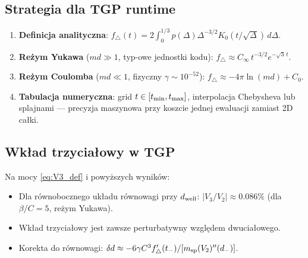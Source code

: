 \documentclass[11pt,a4paper]{article}
\newcommand{\Dt}{\Delta}
\begin{document}
\subsection{Strategia dla TGP runtime}

\begin{enumerate}[label=\arabic*.]
\item \textbf{Definicja analityczna}: $f_\triangle(t) = 2\int_0^{1/3}p(\Dt)\Dt^{-3/2}K_0(t/\sqrt\Dt)\,d\Dt$.
\item \textbf{Re\.{z}ym Yukawa} ($md\gg1$, typ-owe jednostki kodu):
      $f_\triangle\approx C_\infty\,t^{-3/2}e^{-\sqrt3\,t}$.
\item \textbf{Re\.{z}ym Coulomba} ($md\ll1$, fizyczny $\gamma\sim10^{-52}$):
      $f_\triangle\approx-4\pi\ln(md)+C_0$.
\item \textbf{Tabulacja numeryczna}: grid $t\in[t_{\rm min},t_{\rm max}]$,
      interpolacja Chebysheva lub splajnami --- precyzja maszynowa przy koszcie
      jednej ewaluacji zamiast 2D ca\l{}ki.
\end{enumerate}

\subsection{Wk\l{}ad trzycia\l{}owy w TGP}

Na mocy \eqref{eq:V3_def} i powy\.{z}szych wynik\'ow:
\begin{itemize}
\item Dla r\'ownobocznego uk\l{}adu r\'ownowagi przy $d_{\rm well}$:
  $|V_3/V_2|\approx 0.086\%$ (dla $\beta/C=5$, re\.{z}ym Yukawa).
\item Wk\l{}ad trzycia\l{}owy jest zawsze perturbatywny wzgl\k{e}dem dwucia\l{}owego.
\item Korekta do r\'ownowagi: $\delta d \approx
  -6\gamma C^3 f'_\triangle(t_-)/[m_{\rm sp}(V_2)''(d_-)]$.
\end{itemize}






\end{document}
